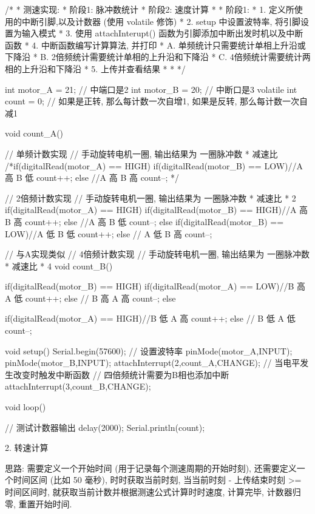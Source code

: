 \documentclass[openany, fontset=windowsold]{ctexbook}
\theoremstyle{kaiti}
\theoremstyle{normal}
\begin{document}
\begin{cpp}
  /*
   * 测速实现:
   *  阶段1: 脉冲数统计
   *  阶段2: 速度计算
   * 
   * 阶段1:
   *  1. 定义所使用的中断引脚,以及计数器 (使用 volatile 修饰)
   *  2. setup 中设置波特率, 将引脚设置为输入模式
   *  3. 使用 attachInterupt() 函数为引脚添加中断出发时机以及中断函数
   *  4. 中断函数编写计算算法, 并打印
   *    A. 单频统计只需要统计单相上升沿或下降沿
   *    B. 2倍频统计需要统计单相的上升沿和下降沿
   *    C. 4倍频统计需要统计两相的上升沿和下降沿
   *  5. 上传并查看结果
   *  
   * 
   */

  int motor_A = 21; // 中端口是2
  int motor_B = 20; // 中断口是3
  volatile int count = 0; // 如果是正转, 那么每计数一次自增1, 如果是反转, 那么每计数一次自减1 

  void count_A(){
    // 单频计数实现
    // 手动旋转电机一圈, 输出结果为 一圈脉冲数 * 减速比
    /*if(digitalRead(motor_A) == HIGH){
      if(digitalRead(motor_B) == LOW){//A 高 B 低
        count++;  
      } else {//A 高 B 高
        count--;  
      }
    }*/

    // 2倍频计数实现
    // 手动旋转电机一圈, 输出结果为 一圈脉冲数 * 减速比 * 2
    if(digitalRead(motor_A) == HIGH){
      if(digitalRead(motor_B) == HIGH){//A 高 B 高
        count++;  
      } else {//A 高 B 低
        count--;  
      }
    } else {
      if(digitalRead(motor_B) == LOW){//A 低 B 低
        count++;  
      } else { // A 低 B 高
        count--;  
      }  
    }
  }

  // 与A实现类似
  // 4倍频计数实现
  // 手动旋转电机一圈, 输出结果为 一圈脉冲数 * 减速比 * 4
  void count_B(){
    if(digitalRead(motor_B) == HIGH){
      if(digitalRead(motor_A) == LOW){//B 高 A 低
        count++;
      } else { // B 高 A 高
        count--;
      }
    } else {

      if(digitalRead(motor_A) == HIGH){//B 低 A 高
        count++;
      } else { // B 低 A 低
        count--;
      }
    }
  }

  void setup() {
    Serial.begin(57600); // 设置波特率  
    pinMode(motor_A,INPUT);
    pinMode(motor_B,INPUT);
    attachInterrupt(2,count_A,CHANGE); // 当电平发生改变时触发中断函数
    // 四倍频统计需要为B相也添加中断
    attachInterrupt(3,count_B,CHANGE);
  }

  void loop() {
    // 测试计数器输出
    delay(2000);
    Serial.println(count);

  }
\end{cpp}

2. 转速计算

思路: 需要定义一个开始时间 (用于记录每个测速周期的开始时刻), 还需要定义一个时间区间 (比如 50 毫秒), 时时获取当前时刻, 当当前时刻 - 上传结束时刻 >= 时间区间时, 就获取当前计数并根据测速公式计算时时速度, 计算完毕, 计数器归零, 重置开始时间.
\end{document}
